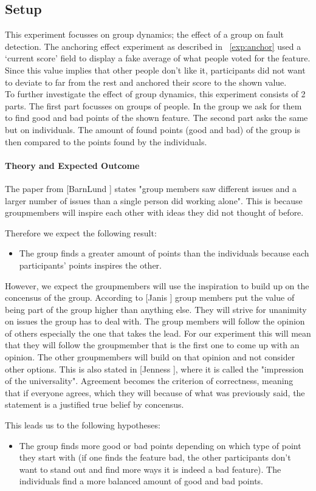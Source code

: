 \documentclass[main.tex]{subfiles}
\begin{document}
\subsection{Setup}
This experiment focusses on group dynamics; the effect of a group on fault detection. The anchoring effect experiment as described in ~\ref{exp:anchor} used a `current score' field to display a fake average of what people voted for the feature. Since this value implies that other people don't like it, participants did not want to deviate to far from the rest and anchored their score to the shown value. \\
To further investigate the effect of group dynamics, this experiment consists of 2 parts. The first part focusses on groups of people. In the group we ask for them to find good and bad points of the shown feature. The second part asks the same but on individuals. The amount of found points (good and bad) of the group is then compared to the points found by the individuals.

\paragraph{Theory and Expected Outcome}
The paper from [BarnLund \cite{barnlund}] states "group members saw different issues and a larger number of issues than a single person did working alone". This is because groupmembers will inspire each other with ideas they did not thought of before. 

Therefore we expect the following result:
\begin{itemize}
\item The group finds a greater amount of points than the individuals because each participants' points inspires the other. 
\end{itemize}


However, we expect the groupmembers will use the inspiration to build up on the concensus of the group.
According to [Janis \cite{janis}] group members put the value of being part of the group higher than anything else. They will strive for unanimity on issues the group has to deal with. The group members will follow the opinion of others especially the one that takes the lead. For our experiment this will mean that they will follow the groupmember that is the first one to come up with an opinion. The other groupmembers will build on that opinion and not consider other options. This is also stated in [Jenness \cite{jenness}], where it is called the "impression of the universality". Agreement becomes the criterion of correctness, meaning that if everyone agrees, which they will because of what was previously said, the statement is a justified true belief by concensus.

This leads us to the following hypotheses:
\begin{itemize}
\item The group finds more good or bad points depending on which type of point they start with (if one finds the feature bad, the other participants don't want to stand out and find more ways it is indeed a bad feature). The individuals find a more balanced amount of good and bad points.
\end{itemize}
\end{document}
